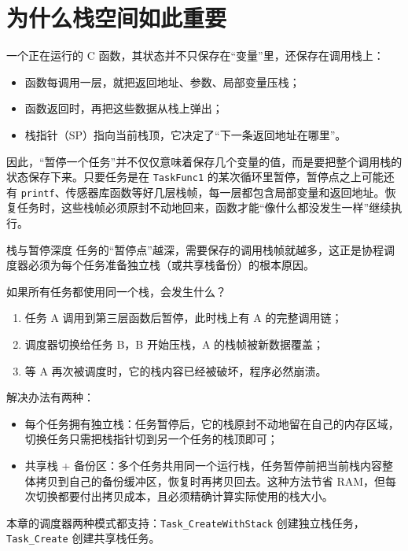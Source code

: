 \section{为什么栈空间如此重要}

一个正在运行的 C 函数，其状态并不只保存在“变量”里，还保存在调用栈上：

\begin{itemize}
\item 函数每调用一层，就把返回地址、参数、局部变量压栈；
\item 函数返回时，再把这些数据从栈上弹出；
\item 栈指针（SP）指向当前栈顶，它决定了“下一条返回地址在哪里”。
\end{itemize}

因此，“暂停一个任务”并不仅仅意味着保存几个变量的值，而是要把整个调用栈的状态保存下来。只要任务是在 \texttt{TaskFunc1} 的某次循环里暂停，暂停点之上可能还有 \texttt{printf}、传感器库函数等好几层栈帧，每一层都包含局部变量和返回地址。恢复任务时，这些栈帧必须原封不动地回来，函数才能“像什么都没发生一样”继续执行。

\begin{anybox}{栈与暂停深度}
任务的“暂停点”越深，需要保存的调用栈帧就越多，这正是协程调度器必须为每个任务准备独立栈（或共享栈备份）的根本原因。
\end{anybox}

如果所有任务都使用同一个栈，会发生什么？

\begin{enumerate}
\item 任务 A 调用到第三层函数后暂停，此时栈上有 A 的完整调用链；
\item 调度器切换给任务 B，B 开始压栈，A 的栈帧被新数据覆盖；
\item 等 A 再次被调度时，它的栈内容已经被破坏，程序必然崩溃。
\end{enumerate}

解决办法有两种：

\begin{itemize}
\item 每个任务拥有独立栈：任务暂停后，它的栈原封不动地留在自己的内存区域，切换任务只需把栈指针切到另一个任务的栈顶即可；
\item 共享栈 + 备份区：多个任务共用同一个运行栈，任务暂停前把当前栈内容整体拷贝到自己的备份缓冲区，恢复时再拷贝回去。这种方法节省 RAM，但每次切换都要付出拷贝成本，且必须精确计算实际使用的栈大小。
\end{itemize}

本章的调度器两种模式都支持：\texttt{Task\_CreateWithStack} 创建独立栈任务， \texttt{Task\_Create} 创建共享栈任务。

